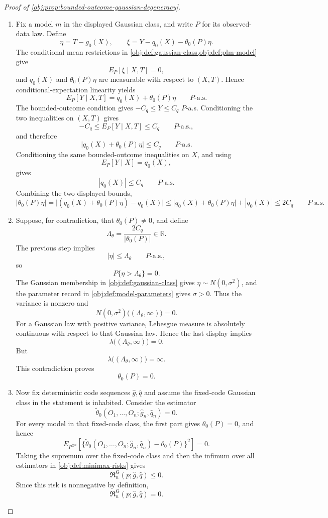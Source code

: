 \begin{proof}[Proof of \cref{obj:prop:bounded-outcome-gaussian-degeneracy}]
\begin{enumerate}
\item Fix a model \(m\) in the displayed Gaussian class, and write \(P\) for its observed-data law. Define
\[
\eta=T-g_0(X),
\qquad
\xi=Y-q_0(X)-\theta_0(P)\eta .
\]
The conditional mean restrictions in \cref{obj:def:gaussian-class,obj:def:plm-model} give
\[
E_P[\xi\mid X,T]=0,
\]
and \(q_0(X)\) and \(\theta_0(P)\eta\) are measurable with respect to \((X,T)\). Hence conditional-expectation linearity yields
\[
E_P[Y\mid X,T]
=
q_0(X)+\theta_0(P)\eta
\qquad P\text{-a.s.}
\]
The bounded-outcome condition gives \(-C_q\le Y\le C_q\) \(P\)-a.s. Conditioning the two inequalities on \((X,T)\) gives
\[
-C_q\le E_P[Y\mid X,T]\le C_q
\qquad P\text{-a.s.},
\]
and therefore
\[
\bigl|q_0(X)+\theta_0(P)\eta\bigr|\le C_q
\qquad P\text{-a.s.}
\]
Conditioning the same bounded-outcome inequalities on \(X\), and using
\[
E_P[Y\mid X]=q_0(X),
\]
gives
\[
|q_0(X)|\le C_q
\qquad P\text{-a.s.}
\]
Combining the two displayed bounds,
\[
|\theta_0(P)\eta|
=
\bigl|(q_0(X)+\theta_0(P)\eta)-q_0(X)\bigr|
\le
\bigl|q_0(X)+\theta_0(P)\eta\bigr|+|q_0(X)|
\le 2C_q
\qquad P\text{-a.s.}
\]

\item Suppose, for contradiction, that \(\theta_0(P)\ne0\), and define
\[
\Lambda_\theta=\frac{2C_q}{|\theta_0(P)|}\in\mathbb R .
\]
The previous step implies
\[
|\eta|\le \Lambda_\theta
\qquad P\text{-a.s.},
\]
so
\[
P\{\eta>\Lambda_\theta\}=0.
\]
The Gaussian membership in \cref{obj:def:gaussian-class} gives \(\eta\sim N(0,\sigma^2)\), and the parameter record in \cref{obj:def:model-parameters} gives \(\sigma>0\). Thus the variance is nonzero and
\[
N(0,\sigma^2)\bigl((\Lambda_\theta,\infty)\bigr)=0.
\]
For a Gaussian law with positive variance, Lebesgue measure is absolutely continuous with respect to that Gaussian law. Hence the last display implies
\[
\lambda\bigl((\Lambda_\theta,\infty)\bigr)=0.
\]
But
\[
\lambda\bigl((\Lambda_\theta,\infty)\bigr)=\infty .
\]
This contradiction proves
\[
\theta_0(P)=0 .
\]

\item Now fix deterministic code sequences \(\widehat g,\widehat q\) and assume the fixed-code Gaussian class in the statement is inhabited. Consider the estimator
\[
\widetilde\theta_0(O_1,\ldots,O_n;\widehat g_n,\widehat q_n)=0 .
\]
For every model in that fixed-code class, the first part gives \(\theta_0(P)=0\), and hence
\[
E_{P^{\otimes n}}\!\left[
\{\widetilde\theta_0(O_1,\ldots,O_n;\widehat g_n,\widehat q_n)-\theta_0(P)\}^2
\right]=0 .
\]
Taking the supremum over the fixed-code class and then the infimum over all estimators in \cref{obj:def:minimax-risks} gives
\[
\mathfrak R_n^{\mathrm G}(p;\widehat g,\widehat q)\le0.
\]
Since this risk is nonnegative by definition,
\[
\mathfrak R_n^{\mathrm G}(p;\widehat g,\widehat q)=0 .
\]


\end{enumerate}
\end{proof}
